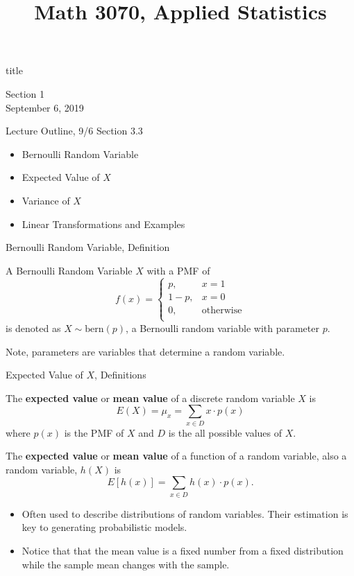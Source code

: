 \documentclass[handout]{beamer}
\title{Math 3070, Applied Statistics}
\newcommand{\nl}[1]{\vspace{#1 em}}
\begin{document}
\begin{frame}
    \begin{beamercolorbox}[rounded=true,wd=\textwidth,center]{title}
        \inserttitle
    \end{beamercolorbox}
    \begin{center}
        Section 1\\
        \nl{0.5}
        September 6, 2019
    \end{center}
\end{frame}

\begin{frame}{Lecture Outline, 9/6}
    Section 3.3
    \begin{itemize}
        \item Bernoulli Random Variable
        \item Expected Value of $X$
        \item Variance of $X$
        \item Linear Transformations and Examples
    \end{itemize}
\end{frame}

\begin{frame}{Bernoulli Random Variable, Definition}
    \begin{block}{}
        A Bernoulli Random Variable $X$ with a PMF of
        $$f(x)= \left\{\begin{array}{lr}
            p, & x = 1\\
            1-p, & x= 0\\
            0, & \text{otherwise}\\
            \end{array}\right.$$
            is denoted as $X \sim \text{bern}(p)$, a Bernoulli random variable with parameter $p$.
    \end{block}
    Note, parameters are variables that determine a random variable.
\end{frame}

\begin{frame}{Expected Value of $X$, Definitions}
    \begin{block}{}
        The \textbf{expected value} or \textbf{mean value} of a discrete random variable $X$ is 
        $$E(X) = \mu_x = \sum_{x \in D} x \cdot p(x) $$
        where $p(x)$ is the PMF of $X$ and $D$ is the all possible values of $X$.
    \end{block}
    \begin{block}{}
        The \textbf{expected value} or \textbf{mean value} of a function of a random variable, also a random variable, $h(X)$ is 
        $$E[h(x)] = \sum_{x \in D} h(x) \cdot p(x) .$$
    \end{block}
    \begin{itemize}
        \item Often used to describe distributions of random variables. Their estimation is key to generating probabilistic models.
        \item Notice that that the mean value is a fixed number from a fixed distribution while the sample mean changes with the sample.
    \end{itemize}
\end{frame}
\end{document}
